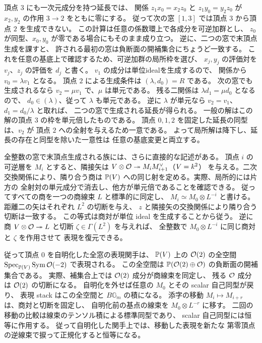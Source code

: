 頂点 $3$ にも一次元成分を持つ延長では、
関係 $z_1x_0=x_2z_0$ と $z_1y_0=y_2z_0$ が
$x_2,y_2$ の作用 $3\to2$ をともに零にする。
従って次の窓 $[1,3]$ では頂点 $3$ から頂点 $2$ を生成できない。
この計算は任意の係数環上で各成分を可逆加群とし、
$z_0$ が同型、$x_0,y_0$ が零である場合にもそのまま成り立つ。
逆に、二つの窓で末頂点生成を課すと、
許される最初の窓は負断面の開補集合にちょうど一致する。
これを任意の基底上で確認するため、可逆加群の局所枠を選び、
$x_j,y_j$ の評価対を $v_j$、$z_j$ の評価を $d_j$ と書く。
$v_1$ の成分は単位idealを生成するので、
関係から $v_0=\lambda v_1$ となる。
頂点 $2$ による生成条件は $(\lambda,d_0)=R$ である。
次の窓でも生成されるなら $v_2=\mu v_1$ で、$\mu$ は単元である。
残る二関係は $\lambda d_1=\mu d_0$ となるので、
$d_0\in(\lambda)$、従って $\lambda$ も単元である。
逆に $\lambda$ が単元なら
$v_2=v_1$、$d_1=d_0/\lambda$ と取れば、
二つの窓で生成される延長が得られる。
一般の解はこの解の頂点 $3$ の枠を単元倍したものである。
頂点 $0,1,2$ を固定した延長の同型は、$v_2$ が
頂点 $2$ への全射を与えるため一意である。
よって局所解は降下し、延長の存在と同型を除いた一意性は
任意の基底変更と両立する。

全整数の窓で末頂点生成される族には、さらに直接的な記述がある。
頂点 $i$ の可逆層を $M_i$ とすると、隣接矢は
$V\otimes\mathcal O\twoheadrightarrow M_iM_{i+1}^{\vee}$（$V=k^2$）
を与える。二次交換関係により、隣り合う商は
$\mathbb P(V)$ への同じ射を定める。実際、局所的には片方の
全射対の単元成分で消去し、他方が単元倍であることを確認できる。
従ってすべての商を一つの商線束 $L$ と標準的に同定し、
$M_i\simeq M_0\otimes L^{-i}$ と書ける。
距離二の矢はそれぞれ $L^2$ の切断を与え、
$z$ と隣接矢の交換関係により隣り合う切断は一致する。
この等式は商対が単位 ideal を生成することから従う。
逆に商 $V\otimes\mathcal O\twoheadrightarrow L$ と切断
$\zeta\in\Gamma(L^2)$ を与えれば、
全整数で $M_0\otimes L^{-i}$ に同じ商対と $\zeta$ を作用させて
表現を復元できる。

従って頂点 $0$ を自明化した全窓の表現関手は、
$\mathbb P(V)$ 上の $\mathcal O(2)$ の全空間
$\operatorname{Spec}_{\mathbb P(V)}\operatorname{Sym}\mathcal O(-2)$ で表現される。
この全空間は $\mathbb P(\mathcal O(2)\oplus\mathcal O)$ の負断面の開補集合である。
実際、補集合上では $\mathcal O(2)$ 成分が商線束を同定し、
残る $\mathcal O$ 成分は $\mathcal O(2)$ の切断になる。
自明化を外せば任意の $M_0$ とその scalar 自己同型が戻り、
表現 stack はこの全空間と $B\mathbb G_m$ の積になる。
添字の移動 $M_i\mapsto M_{i+r}$ は、商対と切断を固定し、
自明化前の基点の線束を $M_0\otimes L^{-r}$ に移す。
二回の移動の比較は線束のテンソル積による標準同型であり、
scalar 自己同型には恒等に作用する。
従って自明化した関手上では、移動した表現を新たな
第零頂点の逆線束で捩って正規化すると恒等になる。

